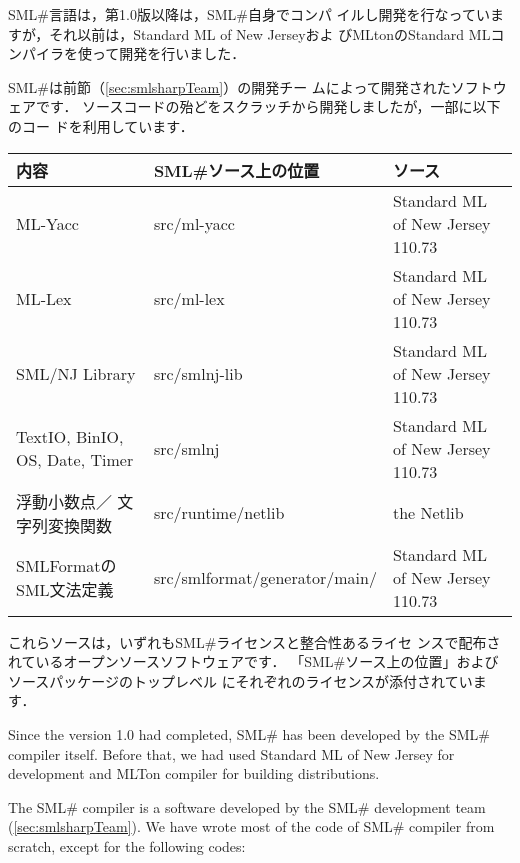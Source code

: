 \documentclass{jbook}
\newcommand{\smlsharp}{SML\#}
\begin{document}
\ifjp%
	\smlsharp{}言語は，第1.0版以降は，\smlsharp{}自身でコンパ
イルし開発を行なっていますが，それ以前は，Standard ML of New Jerseyおよ
びMLtonのStandard MLコンパイラを使って開発を行いました．

	\smlsharp{}は前節（\ref{sec:smlsharpTeam}）の開発チー
ムによって開発されたソフトウェアです．
	ソースコードの殆どをスクラッチから開発しましたが，一部に以下のコー
ドを利用しています．

\begin{center}
\begin{tabular}{|l|l|l|}
\hline
内容 & \smlsharp{}ソース上の位置 & ソース
\\\hline
ML-Yacc & src/ml-yacc  & Standard ML of New Jersey 110.73
\\\hline
ML-Lex & src/ml-lex  & Standard ML of New Jersey 110.73
\\\hline
SML/NJ Library & src/smlnj-lib &  Standard ML of New Jersey 110.73
\\\hline
TextIO,
BinIO,
OS,
Date,
Timer
&
src/smlnj
&
Standard ML of New Jersey 110.73
\\\hline
浮動小数点／
文字列変換関数
&
src/runtime/netlib
&
the Netlib
\\\hline
SMLFormatの
SML文法定義
&
src/smlformat/generator/main/
&
Standard ML of New Jersey 110.73
\\\hline
\end{tabular}
\end{center}

	これらソースは，いずれも\smlsharp{}ライセンスと整合性あるライセ
ンスで配布されているオープンソースソフトウェアです．
	「\smlsharp{}ソース上の位置」およびソースパッケージのトップレベル
にそれぞれのライセンスが添付されています．
\else%

	Since the version 1.0 had completed, \smlsharp{} has been
developed by the \smlsharp{} compiler itself.
	Before that, we had used Standard ML of New Jersey for
development and MLTon compiler for building distributions.  

	The \smlsharp{} compiler is a software developed by the
\smlsharp{} development team (\ref{sec:smlsharpTeam}).
	We have wrote most of the code of \smlsharp{} compiler from
scratch, except for the following codes:
\end{document}
